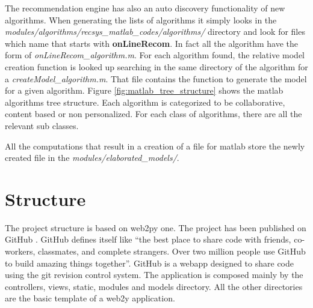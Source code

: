 The recommendation engine has also an auto discovery functionality of new algorithms. When generating the lists of algorithms it simply looks in the \textit{modules/algorithms/recsys\_matlab\_codes/algorithms/} directory and look for files which name that starts with \textbf{onLineRecom}. In fact all the algorithm have the form of \textit{onLineRecom\_algorithm.m}. For each algorithm found, the relative model creation function is looked up searching in the same directory of the algorithm for a \textit{createModel\_algorithm.m}. That file contains the function to generate the model for a given algorithm. Figure \ref{fig:matlab_tree_structure} shows the matlab algorithms tree structure. Each algorithm is categorized to be collaborative, content based or non personalized. For each class of algorithms, there are all the relevant sub classes.

All the computations that result in a creation of a file for matlab store the newly created file in the \textit{modules/elaborated\_models/}.

\section{Structure}
\label{sec:structure}

The project structure is based on web2py \cite{web2py} one. The project has been published on GitHub \cite{github}. GitHub defines itself like ``the best place to share code with friends, co-workers, classmates, and complete strangers. Over two million people use GitHub to build amazing things together''. GitHub is a webapp designed to share code using the git \cite{git-scm} revision control system. The application is composed mainly by the controllers, views, static, modules and models directory. All the other directories are the basic template of a web2y application.

